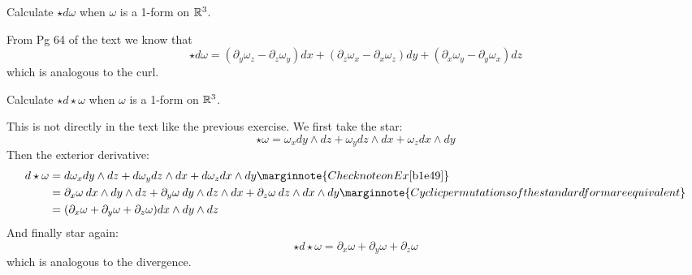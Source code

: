 \documentclass[10pt]{article}
\begin{document}
\begin{example}\label{b1e65}
	Calculate $\star d\omega$ when $\omega$ is a 1-form on $\mathbb{R}^3$.
\end{example}
\sol From Pg 64 of the text we know that
$$
\star d\omega = (\partial_y\omega_z - \partial_z\omega_y)dx + (\partial_z\omega_x - \partial_x\omega_z)dy + (\partial_x\omega_y - \partial_y\omega_x)dz
$$
which is analogous to the curl.


\begin{example}\label{b1e66}
	Calculate $\star d\star\omega$ when $\omega$ is a 1-form on $\mathbb{R}^3$.
\end{example}
\sol This is not directly in the text like the previous exercise. We first take the star:
$$
\star \omega = \omega_x dy \wedge dz + \omega_y dz \wedge dx + \omega_z dx \wedge dy
$$
Then the exterior derivative:
$$
\begin{aligned}
	d\star \omega &= d\omega_x dy \wedge dz + d\omega_y dz \wedge dx + d\omega_z dx \wedge dy\marginnote{Check note on Ex \ref{b1e49}}\\
	&= \partial_x \omega \:dx \wedge dy \wedge dz + \partial_y \omega \:dy \wedge dz \wedge dx + \partial_z \omega \:dz \wedge dx \wedge dy\marginnote{Cyclic permutations of the standard form are equivalent}\\
	&= (\partial_x \omega + \partial_y \omega + \partial_z \omega) dx \wedge dy \wedge dz \\
\end{aligned}
$$
And finally star again:
$$
\star d\star\omega = \partial_x \omega + \partial_y \omega + \partial_z \omega
$$
which is analogous to the divergence.
\end{document}
